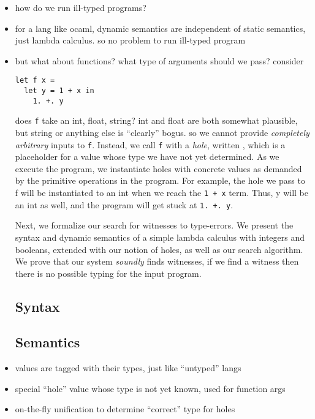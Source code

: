 
\begin{itemize}
\item how do we run ill-typed programs?
\item for a lang like ocaml, dynamic semantics are independent of static
  semantics, just lambda calculus. so no problem to run ill-typed
  program
\item but what about functions? what type of arguments should we pass? consider

\begin{lstlisting}
let f x = 
  let y = 1 + x in
    1. +. y
\end{lstlisting}

does \texttt{f} take an int, float, string? int and float are both
somewhat plausible, but string or anything else is ``clearly'' bogus. so
we cannot provide \emph{completely arbitrary} inputs to
\texttt{f}. Instead, we call \texttt{f} with a \emph{hole}, written
\ehole{}, which is a placeholder for a value whose type we have not
yet determined. As we execute the program, we instantiate holes with
concrete values as demanded by the primitive operations in the
program. For example, the hole we pass to f will be instantiated to an
int when we reach the \lstinline{1 + x} term. Thus, y will be an int as
well, and the program will get stuck at \lstinline{1. +. y}. 

Next, we formalize our search for witnesses to type-errors. We present
the syntax and dynamic semantics of a simple lambda calculus with
integers and booleans, extended with our notion of holes, as well as our
search algorithm. We prove that our system \emph{soundly} finds
witnesses, \ie if we find a witness then there is no possible typing for
the input program.

\subsection{Syntax}
\label{sec:syntax}


\subsection{Semantics}
\label{sec:semantics}



\item values are tagged with their types, just like ``untyped'' langs
\item special ``hole'' value whose type is not yet known, used for function args
\item on-the-fly unification to determine ``correct'' type for holes
\end{itemize}


